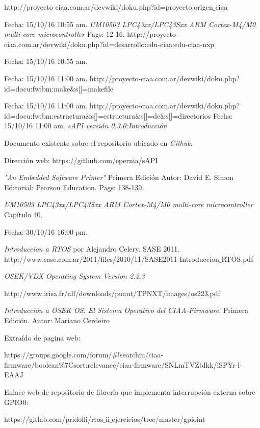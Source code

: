 \documentclass[12pt,letterpaper]{article}
\begin{document}
\begin{thebibliography}{}
 {\footnotesize http://proyecto-ciaa.com.ar/devwiki/doku.php?id=proyecto:origen$\_$ciaa}

Fecha: 15/10/16 10:55 am.
\textit{UM10503
LPC43xx/LPC43Sxx ARM Cortex-M4/M0 multi-core
microcontroller} Pags: 12-16.
 {\footnotesize http://proyecto-ciaa.com.ar/devwiki/doku.php?id=desarrollo:edu-ciaa:edu-ciaa-nxp}

Fecha: 15/10/16 10:55 am.
\

Fecha: 15/10/16 11:00 am.
 {\footnotesize http://proyecto-ciaa.com.ar/devwiki/doku.php?id=docu:fw:bm:make$\&$s[]=makefile}

Fecha: 15/10/16 11:00 am.
 {\footnotesize http://proyecto-ciaa.com.ar/devwiki/doku.php?id=docu:fw:bm:estructura$\&$s[]=estructura$\&$s[]=de$\&$s[]=directorios} Fecha: 15/10/16 11:00 am.
\textit{sAPI versión 0.3.0:Introducción}

Documento existente sobre el repositorio ubicado en \textit{Github}.

Dirección web: https://github.com/epernia/sAPI

\textit{"An Embedded Software Primer"} Primera Edición Autor: David E. Simon Editorial: Pearson Education. Pags: 138-139.

 \textit{UM10503 LPC43xx/LPC43Sxx ARM Cortex-M4/M0 multi-core microcontroller} Capítulo 40.


Fecha: 30/10/16 16:00 pm.

 \textit{Introduccion a RTOS} por Alejandro Celery. SASE 2011.
{\footnotesize http://www.sase.com.ar/2011/files/2010/11/SASE2011-Introduccion$\_$RTOS.pdf}

\textit{OSEK/VDX Operating System Version 2.2.3}

{\footnotesize http://www.irisa.fr/alf/downloads/puaut/TPNXT/images/os223.pdf}

\textit{Introducción a OSEK OS: El Sistema Operativo del CIAA-Firmware}. Primera Edición. Autor: Mariano Cerdeiro

 Extraído de pagina web:

{\footnotesize https://groups.google.com/forum/$\#$!searchin/ciaa-firmware/boolean\%7Csort:relevance/ciaa-firmware/SNLmTVZbIkk/iSPYr-l-EAAJ}

 Enlace web de repositorio de librería que implementa interrupción externa sobre GPIO0:

{\footnotesize https://gitlab.com/pridolfi/rtos$\_$ii$\_$ejercicios/tree/master/gpioint}
\end{thebibliography}
\end{document}
